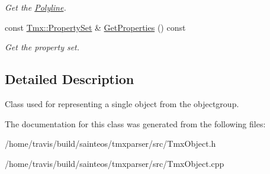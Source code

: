 \begin{DoxyCompactItemize}
\begin{DoxyCompactList}\small\item\em Get the \hyperlink{classTmx_1_1Polyline}{Polyline}. \end{DoxyCompactList}\item 
\hypertarget{classTmx_1_1Object_a657ad454037bcb1993e4bcffe47daa04}{const \hyperlink{classTmx_1_1PropertySet}{Tmx\-::\-Property\-Set} \& \hyperlink{classTmx_1_1Object_a657ad454037bcb1993e4bcffe47daa04}{Get\-Properties} () const }\label{classTmx_1_1Object_a657ad454037bcb1993e4bcffe47daa04}

\begin{DoxyCompactList}\small\item\em Get the property set. \end{DoxyCompactList}\end{DoxyCompactItemize}


\subsection{Detailed Description}
Class used for representing a single object from the objectgroup. 

The documentation for this class was generated from the following files\-:\begin{DoxyCompactItemize}
\item 
/home/travis/build/sainteos/tmxparser/src/Tmx\-Object.\-h\item 
/home/travis/build/sainteos/tmxparser/src/Tmx\-Object.\-cpp\end{DoxyCompactItemize}
